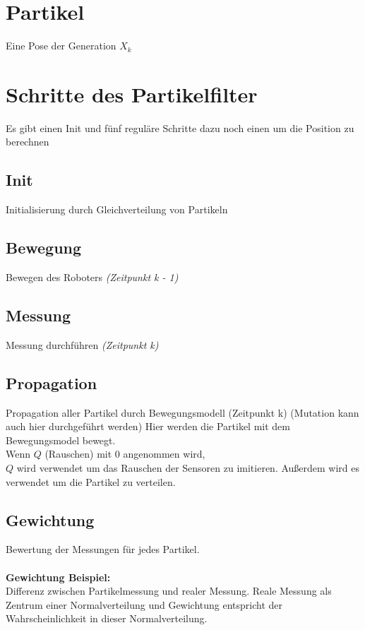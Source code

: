 	\section{Partikel}
		Eine Pose der Generation $X_k$
		
	\section{Schritte des Partikelfilter}

		Es gibt einen Init und fünf reguläre Schritte dazu noch einen um die Position zu berechnen
		
		\subsection{Init}
		Initialisierung durch Gleichverteilung von Partikeln
		
		\subsection{Bewegung}
		Bewegen des Roboters \textit{(Zeitpunkt k - 1)}
		
		\subsection{Messung}
		Messung durchführen \textit{(Zeitpunkt k)}
		
		\subsection{Propagation}
		Propagation aller Partikel durch Bewegungsmodell (Zeitpunkt k) (Mutation kann auch hier durchgeführt werden)
		Hier werden die Partikel mit dem Bewegungsmodel bewegt. \\
		Wenn $Q$ (Rauschen) mit 0 angenommen wird, \\
		$Q$ wird verwendet um das Rauschen der Sensoren zu imitieren. Außerdem wird es verwendet um die Partikel zu verteilen.
		
		\subsection{Gewichtung}
		Bewertung der Messungen für jedes Partikel. \\
		\\
		\textbf{Gewichtung Beispiel:} \\
		Differenz zwischen Partikelmessung und realer Messung. Reale Messung als Zentrum einer Normalverteilung und Gewichtung entspricht der Wahrscheinlichkeit in dieser Normalverteilung.
		
